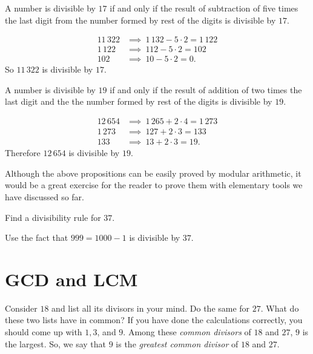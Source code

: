 \documentclass{subfile}
\begin{document}
	\begin{proposition}[Divisibility by $17$]
		A number is divisible by $17$ if and only if the result of subtraction of five times the last digit from the number formed by rest of the digits is divisible by $17$.
	\end{proposition}

	\begin{example}
		\begin{align*}
			11\, 322 & \implies \ 1\, 132 - 5 \cdot 2 = 1\, 122 \\
			1\, 122 & \implies  \ 112 - 5 \cdot 2 =   102 \\
			102 & \implies \ 10 - 5 \cdot 2 =  0.
		\end{align*}
		So $11\, 322$ is divisible by $17$.
	\end{example}

	\begin{proposition}[Divisibility by $19$]
		A number is divisible by $19$ if and only if the result of addition of two times the last digit and the the number formed by rest of the digits is divisible by $19$.
	\end{proposition}

	\begin{example}
		\begin{align*}
			12 \, 654 & \implies \ 1\, 265 + 2 \cdot 4 = 1\, 273 \\
			1\, 273 & \implies  \ 127 + 2 \cdot 3 =   133 \\
			133 & \implies \ 13 + 2 \cdot 3 =  19.
		\end{align*}
		Therefore $12\, 654$ is divisible by $19$.
	\end{example}

	Although the above propositions can be easily proved by modular arithmetic, it would be a great exercise for the reader to prove them with elementary tools we have discussed so far.

	\begin{problem}
		Find a divisibility rule for $37$.
	\end{problem}

	\begin{hint}
		Use the fact that $999=1000-1$ is divisible by $37$.
	\end{hint}

	\section{GCD and LCM}\label{sec:gcd-lcm}
	Consider $18$ and list all its divisors in your mind. Do the same for $27$. What do these two lists have in common? If you have done the calculations correctly, you should come up with $1,3$, and $9$. Among these \textit{common divisors} of $18$ and $27$, $9$ is the largest. So, we say that $9$ is the \textit{greatest common divisor} of $18$ and $27$.
\end{document}
